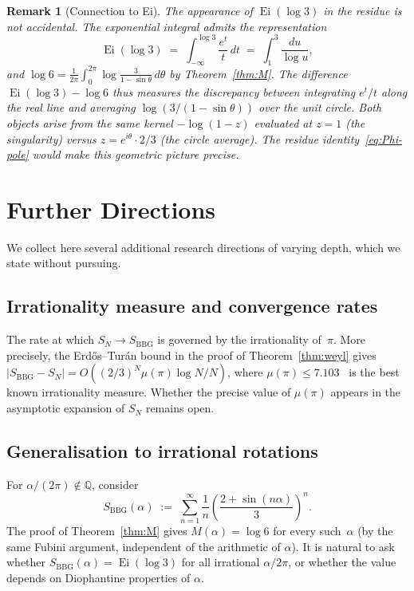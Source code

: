 \documentclass[12pt]{amsart}
\newtheorem{remark}[theorem]{Remark}
\DeclareMathOperator{\Ei}{Ei}
\begin{document}
\begin{remark}[Connection to Ei]\label{rem:Ei-connection}
The appearance of $\Ei(\log 3)$ in the residue is not accidental.
The exponential integral admits the representation
\[
  \Ei(\log 3) \;=\; \int_{-\infty}^{\log 3}\frac{e^t}{t}\,dt
              \;=\; \int_{1}^{3}\frac{du}{\log u},
\]
and $\log 6 = \frac{1}{2\pi}\int_0^{2\pi}\log\frac{3}{1-\sin\theta}\,d\theta$
by Theorem~\ref{thm:M}.  The difference
$\Ei(\log 3)-\log 6$ thus measures the discrepancy between
integrating $e^t/t$ along the real line and averaging
$\log(3/(1-\sin\theta))$ over the unit circle.  Both objects arise
from the same kernel $-\log(1-z)$ evaluated at $z=1$ (the
singularity) versus $z=e^{i\theta}\cdot 2/3$ (the circle average).
The residue identity~\eqref{eq:Phi-pole} would make this
geometric picture precise.
\end{remark}

\section{Further Directions}

We collect here several additional research directions of varying
depth, which we state without pursuing.

\subsection{Irrationality measure and convergence rates}

The rate at which $S_N\to S_{\mathrm{BBG}}$ is governed by
the irrationality of~$\pi$.  More precisely, the Erd\H{o}s--Tur\'an
bound in the proof of Theorem~\ref{thm:weyl} gives
$|S_{\mathrm{BBG}}-S_N|=O((2/3)^N \mu(\pi)\log N/N)$, where
$\mu(\pi)\le 7.103$~\cite{ZeilbergerZudilin2020} is the best known
irrationality measure.  Whether the precise value of $\mu(\pi)$
appears in the asymptotic expansion of $S_N$ remains open.

\subsection{Generalisation to irrational rotations}

For $\alpha/(2\pi)\notin\mathbb{Q}$, consider
\[
  S_{\mathrm{BBG}}(\alpha)
  \;:=\;
  \sum_{n=1}^{\infty}\frac{1}{n}
  \!\left(\frac{2+\sin(n\alpha)}{3}\right)^{\!n}.
\]
The proof of Theorem~\ref{thm:M} gives $M(\alpha)=\log 6$ for every
such~$\alpha$ (by the same Fubini argument, independent of the
arithmetic of $\alpha$).  It is natural to ask whether
$S_{\mathrm{BBG}}(\alpha)=\Ei(\log 3)$ for all irrational $\alpha/2\pi$,
or whether the value depends on Diophantine properties of $\alpha$.
\end{document}
